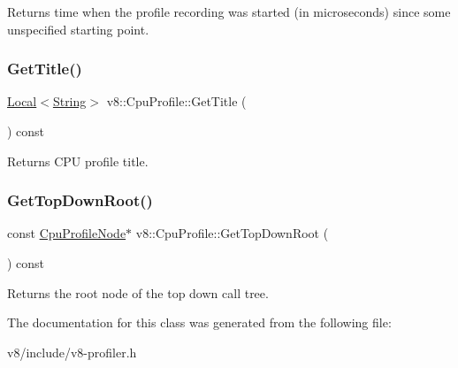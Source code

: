 Returns time when the profile recording was started (in microseconds) since some unspecified starting point. \mbox{\label{classv8_1_1CpuProfile_a73f50dc829b3b2aea9e1776872cd862e}} 
\subsubsection{\texorpdfstring{Get\+Title()}{GetTitle()}}
{\footnotesize\ttfamily \mbox{\hyperlink{classv8_1_1Local}{Local}}$<$\mbox{\hyperlink{classv8_1_1String}{String}}$>$ v8\+::\+Cpu\+Profile\+::\+Get\+Title (\begin{DoxyParamCaption}{ }\end{DoxyParamCaption}) const}

Returns C\+PU profile title. \mbox{\label{classv8_1_1CpuProfile_aa6cfe834fde315635934564bbba97184}} 
\subsubsection{\texorpdfstring{Get\+Top\+Down\+Root()}{GetTopDownRoot()}}
{\footnotesize\ttfamily const \mbox{\hyperlink{classv8_1_1CpuProfileNode}{Cpu\+Profile\+Node}}$\ast$ v8\+::\+Cpu\+Profile\+::\+Get\+Top\+Down\+Root (\begin{DoxyParamCaption}{ }\end{DoxyParamCaption}) const}

Returns the root node of the top down call tree. 

The documentation for this class was generated from the following file\+:\begin{DoxyCompactItemize}
\item 
v8/include/v8-\/profiler.\+h\end{DoxyCompactItemize}
